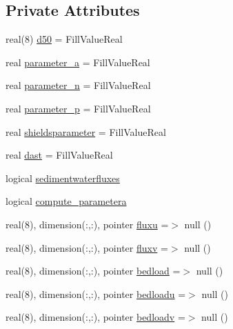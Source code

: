 \subsection*{Private Attributes}
\begin{DoxyCompactItemize}
\item 
real(8) \mbox{\hyperlink{structmodulesediment_1_1t__sand_ac8071060e5460cdff6fbc9f307d4507a}{d50}} = Fill\+Value\+Real
\item 
real \mbox{\hyperlink{structmodulesediment_1_1t__sand_a4f284c0db0a4f76df1a2d3e3370300d6}{parameter\+\_\+a}} = Fill\+Value\+Real
\item 
real \mbox{\hyperlink{structmodulesediment_1_1t__sand_a6207fd9cca4163fa1fb2424d813c2382}{parameter\+\_\+n}} = Fill\+Value\+Real
\item 
real \mbox{\hyperlink{structmodulesediment_1_1t__sand_ab6d5679b8f79b1219395986265800b95}{parameter\+\_\+p}} = Fill\+Value\+Real
\item 
real \mbox{\hyperlink{structmodulesediment_1_1t__sand_a3e31efd986fcbd1aa1cd65e72eb5d6f4}{shieldsparameter}} = Fill\+Value\+Real
\item 
real \mbox{\hyperlink{structmodulesediment_1_1t__sand_af2fb7e45d5dfc8d461be733f4826e1cd}{dast}} = Fill\+Value\+Real
\item 
logical \mbox{\hyperlink{structmodulesediment_1_1t__sand_a7b400e1df88ffff77611d3e4e4d41608}{sedimentwaterfluxes}}
\item 
logical \mbox{\hyperlink{structmodulesediment_1_1t__sand_ad421a319c4d3423e9f9d4e82d6c5a54d}{compute\+\_\+parametera}}
\item 
real(8), dimension(\+:,\+:), pointer \mbox{\hyperlink{structmodulesediment_1_1t__sand_aadca91ab62038cf5378b450af3d9f68f}{fluxu}} =$>$ null ()
\item 
real(8), dimension(\+:,\+:), pointer \mbox{\hyperlink{structmodulesediment_1_1t__sand_a04b17ae2841bb3533be44ed6207e72af}{fluxv}} =$>$ null ()
\item 
real(8), dimension(\+:,\+:), pointer \mbox{\hyperlink{structmodulesediment_1_1t__sand_ac67aa5cc53bbfdd21cc079d21e12bdff}{bedload}} =$>$ null ()
\item 
real(8), dimension(\+:,\+:), pointer \mbox{\hyperlink{structmodulesediment_1_1t__sand_a71d9c8e1c0815bf7972a233a525f3113}{bedloadu}} =$>$ null ()
\item 
real(8), dimension(\+:,\+:), pointer \mbox{\hyperlink{structmodulesediment_1_1t__sand_ab3068535929bc7f17c2b173e8f0ce8bd}{bedloadv}} =$>$ null ()
\item 

\end{DoxyCompactItemize}

